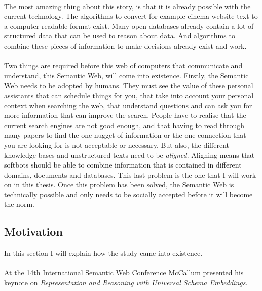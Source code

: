 \documentclass{article}
\begin{document}
 \paragraph{}
 The most amazing thing about this story, is that it is already possible with the current technology. The algorithms to convert for example cinema website text to a computer-readable format exist. Many open databases already contain a lot of structured data that can be used to reason about data. And algorithms to combine these pieces of information to make decisions already exist and work.
 \paragraph{}
 Two things are required before this web of computers that communicate and understand, this Semantic Web, will come into existence.
 Firstly, the Semantic Web needs to be adopted by humans. They must see the value of these personal assistants that can schedule things for you, that take into account your personal context when searching the web, that understand questions and can ask you for more information that can improve the search. People have to realise that the current search engines are not good enough, and that having to read through many papers to find the one nugget of information or the one connection that you are looking for is not acceptable or necessary.
 But also, the different knowledge bases and unstructured texts need to be \emph{aligned}. Aligning means that softbots should be able to combine information that is contained in different domains, documents and databases. This last problem is the one that I will work on in this thesis. Once this problem has been solved, the Semantic Web is technically possible and only needs to be socially accepted before it will become the norm. %
 \subsection{Motivation}
 In this section I will explain how the study came into existence.
 \paragraph{}
 At the 14th International Semantic Web Conference McCallum presented his keynote on \emph{Representation and Reasoning with Universal Schema Embeddings}\cite{mccallumweblecture}. 
 
\end{document}
